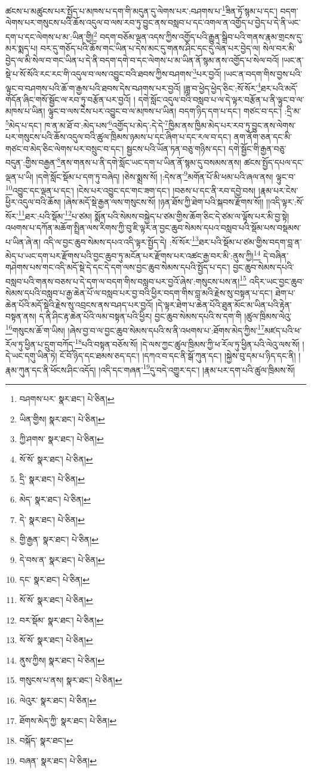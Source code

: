 ཚངས་པ་མཚུངས་པར་སྤྱོད་པ་མཁས་པ་དག་གི་མདུན་དུ་ལེགས་པར་:བཤགས་པ་\footnote{བཤགས་པར་  སྣར་ཐང་།  པེ་ཅིན། }ཟིན་ཏོ་སྙམ་པ་དང་། བདག་ལེགས་པར་གསུངས་པའི་ཆོས་འདུལ་བ་ལས་རབ་ཏུ་བྱུང་ནས་བསླབ་པ་དང་འགལ་ན་འགྱོད་པ་བྱེད་པ་དེ་ནི་ཡང་དག་པ་དང་ལེགས་པ་མ་:ཡིན་གྱི།\footnote{ཡིན་གྱིས།  སྣར་ཐང་།  པེ་ཅིན། } བདག་བཅོམ་ལྡན་འདས་ཀྱིས་འགྱོད་པའི་རྒྱུན་སྒྲིབ་པའི་གནས་རྣམ་གྲངས་དུ་མར་སྨད་པ། བར་དུ་གཅོད་པའི་ཆོས་གང་ཡིན་པ་དེས་མང་དུ་གནས་ཤིང་དང་དུ་ལེན་པར་བྱེད་ལ། སེལ་བར་མི་བྱེད་ལ་མི་སེལ་བ་གང་ཡིན་པ་དེ་ནི་བདག་དགེ་བ་དང་ལེགས་པ་མ་ཡིན་ནོ་སྙམ་ནས་འགྱོད་པ་སེལ་བའོ། །ཡང་ན་སྡེ་པ་སོ་སོའི་རང་རང་གི་འདུལ་བ་ལས་འབྱུང་བའི་ཐབས་ཀྱིས་བཤགས་\footnote{ཀྱི་ཤགས་  སྣར་ཐང་།  པེ་ཅིན། }པར་བྱའོ། །ཡང་ན་བདག་གིས་བྱས་པའི་ལྟུང་བ་བཤགས་པའི་ཆོ་ག་རྒྱས་པའི་ཐབས་དེས་བཤགས་པར་བྱའོ། །ཟླ་བ་ཕྱེད་ཕྱེད་ཅིང་:སོ་སོར་\footnote{སོ་སོ་  སྣར་ཐང་།  པེ་ཅིན། }ཐར་པའི་མདོ་གདོན་ཞིང་གསོ་སྦྱོང་ལ་རབ་ཏུ་བརྩོན་པར་བྱའོ། །
དགེ་སློང་འདུལ་བའི་བསླབ་པ་ལ་དེ་ལྟར་བརྩོན་པ་ནི་ལྟུང་བ་ལ་མཁས་པ་ཡིན། ལྟུང་བ་ལས་ངེས་པར་འབྱུང་བ་ལ་མཁས་པ་ཡིན། བདག་ཉིད་དག་པ་དང་། གཙང་བ་དང་། :དྲི་མ་\footnote{དྲི་  སྣར་ཐང་།  པེ་ཅིན། }མེད་པ་དང་། ཁ་ན་མ་ཐོ་བ་:མེད་པས་\footnote{མེད་  སྣར་ཐང་།  པེ་ཅིན། }འགྱོད་པ་མེད་:དེ་དེ་\footnote{དེ་  སྣར་ཐང་།  པེ་ཅིན། }ཁྱིམ་ནས་ཁྱིམ་མེད་པར་རབ་ཏུ་བྱུང་ནས་ལེགས་པར་གསུངས་པའི་ཆོས་འདུལ་བའི་ཚུལ་ཁྲིམས་ཉམས་པ་དང་ཞིག་པ་དང་རལ་བ་དང་། ནག་ནོག་ཅན་དང་མི་གཙང་བ་མེད་ཅིང་ལེགས་པར་བསྲུང་བ་དང་། སྦྱངས་པའི་ཡོན་ཏན་བཅུ་གཉིས་དང་། དགེ་སྦྱོང་གི་རྒྱན་བཅུ་བདུན་:གྱིས་བརྒྱན་\footnote{གྱི་རྒྱན་  སྣར་ཐང་།  པེ་ཅིན། }ནས་གནས་པ་ནི་དགེ་སློང་ཡང་དག་པ་ཡིན་ནོ་སྙམ་དུ་བསམས་ནས། ཚངས་སྤྱོད་དཔལ་དང་ལྡན་པ་ཡི། །དགེ་སློང་སྡོམ་པ་དག་ཏུ་བཞེད། །ཅེས་སྨྲས་སོ། །:དེས་ན་\footnote{དེ་བས་ན་  སྣར་ཐང་།  པེ་ཅིན། }མགོན་པོ་མི་ཕམ་པའི་ཞལ་ནས། ལྟུང་བ་\footnote{དང་  སྣར་ཐང་།  པེ་ཅིན། }འབྱུང་དང་ལྡན་པ་དང་། །ངེས་པར་འབྱུང་དང་གང་ཟག་དང་། །བཅས་པ་དང་ནི་རབ་དབྱེ་བས། །རྣམ་པར་ངེས་ཕྱིར་འདུལ་བའི་ཆོས། །ཞེས་མདོ་སྡེ་རྒྱན་ལས་གསུངས་སོ། །ཉན་ཐོས་ཀྱི་ཐེག་པའི་སྐབས་རྫོགས་སོ།། །།འདི་ལྟར་:སོ་སོར་\footnote{སོ་སོ་  སྣར་ཐང་།  པེ་ཅིན། }ཐར་:པའི་སྡོམ་\footnote{བར་སྡོམ་  སྣར་ཐང་།  པེ་ཅིན། }པ་ཙམ། སྨོན་པའི་སེམས་བསྐྱེད་པ་ཙམ་གྱིས་ཆོག་ཅིང་དེ་ཙམ་ལ་ལྟོས་པར་མི་བྱ་སྟེ། འཕགས་པ་དཀོན་མཆོག་སྤྲིན་ལས་རིགས་ཀྱི་བུ་ཇི་ལྟར་ན་བྱང་ཆུབ་སེམས་དཔའ་བསླབ་པའི་སྡོམ་པས་བསྡམས་པ་ཡིན་ཞེ་ན། འདི་ལ་བྱང་ཆུབ་སེམས་དཔའ་འདི་ལྟར་སྤྱོད་དེ། :སོ་སོར་\footnote{སོ་སོ་  སྣར་ཐང་།  པེ་ཅིན། }ཐར་པའི་སྡོམ་པ་ཙམ་གྱིས་བདག་བླ་ན་མེད་པ་ཡང་དག་པར་རྫོགས་པའི་བྱང་ཆུབ་ཏུ་མངོན་པར་རྫོགས་པར་འཚང་རྒྱ་བར་མི་:ནུས་ཀྱི།\footnote{ནུས་ཀྱིས།  སྣར་ཐང་།  པེ་ཅིན། } དེ་བཞིན་གཤེགས་པས་གང་འདི་མདོ་སྡེ་དེ་དང་དེ་དག་ལས་བྱང་ཆུབ་སེམས་དཔའི་སྤྱོད་པ་དང་། བྱང་ཆུབ་སེམས་དཔའི་བསླབ་པའི་གནས་བཅས་པ་དེ་དག་ལ་བདག་གིས་བསླབ་པར་བྱའོ་ཞེས་:གསུངས་པས་ན།\footnote{གསུངས་པ་ནས།  སྣར་ཐང་།  པེ་ཅིན། } འདིར་ཡང་བྱང་ཆུབ་སེམས་དཔའི་བསླབ་པ་རྒྱ་ཆེན་པོ་ལ་བསླབ་པར་བྱ་བའི་ཕྱིར་བདག་གིས་བླ་མའི་རྗེས་སུ་བསྟན་པ་དང་། ཐེག་པ་ཆེན་པོའི་མདོ་སྡེའི་རྗེས་སུ་འབྲངས་ནས་བཤད་པར་བྱའོ། །དེ་ལྟར་ཐེག་པ་ཆེན་པོའི་ཐུན་མོང་མ་ཡིན་པའི་རྟེན་བསྟན་ནས། ད་ནི་ཤིང་རྟ་ཆེན་པོའི་ལམ་བསྟན་པའི་ཕྱིར། བྱང་ཆུབ་སེམས་དཔའི་ས་དག་གི །ཚུལ་ཁྲིམས་ལེའུ་\footnote{ལེའུར་  སྣར་ཐང་།  པེ་ཅིན། }གསུངས་ཆོ་ག་ཡིས། །ཞེས་བྱ་བ་ལ་བྱང་ཆུབ་སེམས་དཔའི་ས་ནི་འཕགས་པ་:ཐོགས་མེད་ཀྱིས་\footnote{ཐོགས་མེད་ཀྱི་  སྣར་ཐང་།  པེ་ཅིན། }མཛད་པའི་ཕ་རོལ་ཏུ་ཕྱིན་པ་དྲུག་བཀོད་\footnote{བསྐོད་  སྣར་ཐང་། }པའི་བསྟན་བཅོས་སོ། །དེ་ལས་ཀྱང་ཚུལ་ཁྲིམས་ཀྱི་ཕ་རོལ་ཏུ་ཕྱིན་པའི་ལེའུ་ལས་སོ། །དེ་ཡང་དགུ་ཡིན་ཏེ། ངོ་བོ་ཉིད་དང་ཐམས་ཅད་དང་། །དཀའ་བ་དང་ནི་སྒོ་ཀུན་དང་། །སྐྱེས་བུ་དམ་པ་ཉིད་དང་ནི། །རྣམ་ཀུན་དང་ནི་ཕོངས་ཤིང་འདོད། །འདི་དང་གཞན་\footnote{བཞན་  སྣར་ཐང་།  པེ་ཅིན། }དུ་བདེ་འགྱུར་དང་། །རྣམ་པར་དག་པའི་ཚུལ་ཁྲིམས་སོ། 